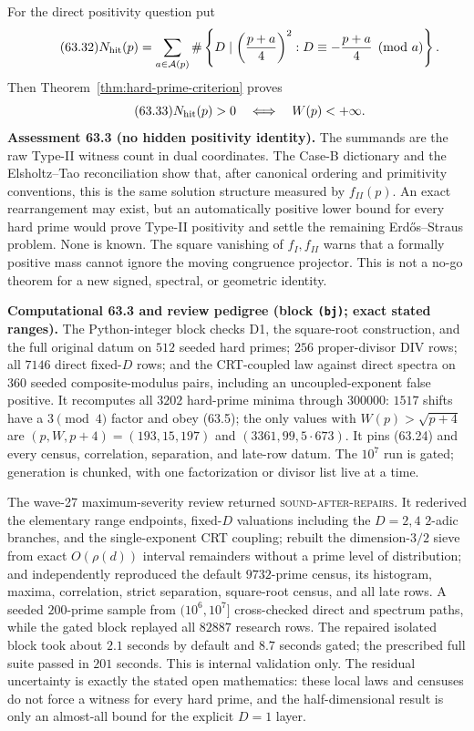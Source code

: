 \documentclass[10pt,reqno]{amsart}
\theoremstyle{definition}
\newcommand{\1}{\mathbf 1}
\begin{document}
For the direct positivity question put
\begin{equation}\tag{63.32}
 N_{\rm hit}(p)=\sum_{a\in\mathcal A(p)}
 \#\left\{D\mid\left({p+a\over4}\right)^2:
 D\equiv-{p+a\over4}\pmod a\right\}.
\end{equation}
Then Theorem~\ref{thm:hard-prime-criterion} proves
\begin{equation}\tag{63.33}
                  N_{\rm hit}(p)>0\quad\Longleftrightarrow\quad W(p)<+\infty.
\end{equation}
\medskip\noindent\textbf{Assessment 63.3 (no hidden positivity identity).}
The summands are the raw Type-II witness count in dual coordinates.  The
Case-B dictionary and the Elsholtz--Tao reconciliation show that, after
canonical ordering and primitivity conventions, this is the same solution
structure measured by $f_{II}(p)$.  An exact rearrangement may exist, but an
automatically positive lower bound for every hard prime would prove Type-II
positivity and settle the remaining Erd\H{o}s--Straus problem.  None is
known.  The square vanishing of $f_I,f_{II}$ warns that a formally positive
mass cannot ignore the moving congruence projector.  This is not a no-go
theorem for a new signed, spectral, or geometric identity.

\medskip\noindent\textbf{Computational 63.3 and review pedigree (block
\texttt{(bj)}; exact stated ranges).}
The Python-integer block checks D1, the square-root construction, and the
full original datum on $512$ seeded hard primes; $256$ proper-divisor DIV
rows; all $7146$ direct fixed-$D$ rows; and the CRT-coupled law against
direct spectra on $360$ seeded composite-modulus pairs, including an
uncoupled-exponent false positive.  It recomputes all $3202$ hard-prime
minima through $300000$: $1517$ shifts have a $3\pmod4$ factor and obey
(63.5); the only values with $W(p)>\sqrt{p+4}$ are
$(p,W,p+4)=(193,15,197)$ and $(3361,99,5\cdot673)$.  It pins
(63.24) and every census, correlation, separation, and late-row datum.
The $10^7$ run is gated; generation is chunked, with one factorization or
divisor list live at a time.

The wave-27 maximum-severity review returned
\textsc{sound-after-repairs}.  It rederived the elementary range endpoints,
fixed-$D$ valuations including the $D=2,4$ $2$-adic branches, and the
single-exponent CRT coupling; rebuilt the dimension-$3/2$ sieve from exact
$O(\rho(d))$ interval remainders without a prime level of distribution; and
independently reproduced the default $9732$-prime census, its histogram,
maxima, correlation, strict separation, square-root census, and all late
rows.  A seeded $200$-prime sample from $(10^6,10^7]$ cross-checked direct
and spectrum paths, while the gated block replayed all $82887$ research
rows.  The repaired isolated block took about $2.1$ seconds by default and
$8.7$ seconds gated; the prescribed full suite passed in $201$ seconds.
This is internal validation only.  The residual uncertainty is exactly the
stated open mathematics: these local laws and censuses do not force a
witness for every hard prime, and the half-dimensional result is only an
almost-all bound for the explicit $D=1$ layer.
\end{document}
